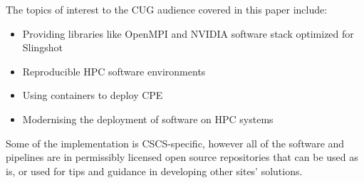 The topics of interest to the CUG audience covered in this paper include:
\begin{itemize}
    \item Providing libraries like OpenMPI and NVIDIA software stack optimized for Slingshot
    \item Reproducible HPC software environments
    \item Using containers to deploy CPE
    \item Modernising the deployment of software on HPC systems
\end{itemize}
Some of the implementation is CSCS-specific, however all of the software and pipelines are in permissibly licensed open source repositories that can be used as is, or used for tips and guidance in developing other sites' solutions.
